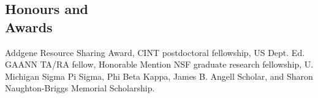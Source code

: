 \documentclass[margin,line]{resume}
\begin{document}
\begin{resume}
    
    \section{\mysidestyle Honours and\\Awards} 

    Addgene Resource Sharing Award, CINT postdoctoral fellowship, US Dept. Ed. GAANN TA/RA fellow, Honorable Mention NSF graduate research fellowship, U. Michigan Sigma Pi Sigma, Phi Beta Kappa, James B. Angell Scholar, and Sharon Naughton-Briggs Memorial Scholarship.     


\end{resume}
\end{document}
